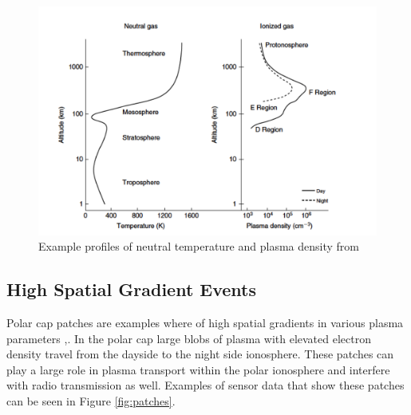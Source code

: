 \begin{figure}[!t]
\centering
\includegraphics[width=5in]{altvsparams}
\caption{Example profiles of neutral temperature and plasma density from \cite{kellybook}}
\label{fig:singlefilt}
\end{figure}

\subsection*{High Spatial Gradient Events}
Polar cap patches are examples where of high spatial gradients in various plasma parameters \cite{Dahlgren:2012dq},\cite{dahlgren2012di}.  In the polar cap large blobs of plasma with elevated electron density travel from the dayside to the night side ionosphere.  These patches can play a large role in plasma transport within the polar ionosphere and interfere with radio transmission as well.  Examples of sensor data that show these patches can be seen in Figure \ref{fig:patches}.

